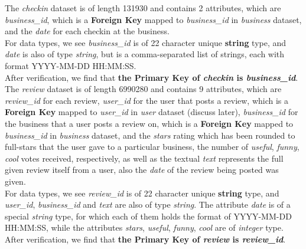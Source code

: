 \documentclass[runningheads]{llncs}
\begin{document}
The \textit{checkin} dataset is of length 131930 and contains 2 attributes, which are \textit{business\_id}, which is a \textbf{Foreign Key} mapped to \textit{business\_id} in \textit{business} dataset, and the \textit{date} for each checkin at the business. \\
For data types, we see \textit{business\_id} is of 22 character unique \textbf{string} type, and \textit{date} is also of type \textit{string}, but  is a comma-separated list of strings, each with format YYYY-MM-DD HH:MM:SS. \\
After verification, we find that \textbf{the Primary Key of \textit{checkin} is \textit{business\_id}}. \\

The \textit{review} dataset is of length 6990280 and contains 9 attributes, which are \textit{review\_id} for each review, \textit{user\_id} for the user that posts a review, which is a \textbf{Foreign Key} mapped to \textit{user\_id} in \textit{user} dataset (discuss later), \textit{business\_id} for the business that a user posts a review on, which is a \textbf{Foreign Key} mapped to \textit{business\_id} in \textit{business} dataset, and the \textit{stars} rating which has been rounded to full-stars that the user gave to a particular business, the number of \textit{useful}, \textit{funny}, \textit{cool} votes received, respectively, as well as the textual \textit{text} represents the full given review itself from a user, also the \textit{date} of the review being posted was given.\\
For data types, we see \textit{review\_id} is of 22 character unique \textbf{string} type, and \textit{user\_id}, \textit{business\_id} and \textit{text} are also of type \textit{string}. The attribute \textit{date} is of a special \textit{string} type, for which each of them holds the format of YYYY-MM-DD HH:MM:SS, while the attributes \textit{stars}, \textit{useful}, \textit{funny}, \textit{cool} are of \textit{integer} type. \\
After verification, we find that \textbf{the Primary Key of \textit{review} is \textit{review\_id}}. \\
\end{document}
